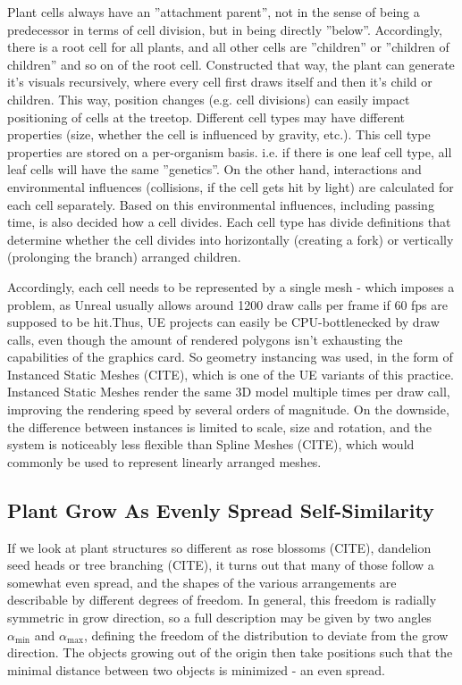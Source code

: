 \documentclass[11pt]{scrartcl}
\begin{document}
Plant cells always have an ''attachment parent'', not in the sense of being a predecessor in terms of cell division, but in being directly ''below''. Accordingly, there is a root cell for all plants, and all other cells are ''children'' or ''children of children'' and so on of the root cell. Constructed that way, the plant can generate it's visuals recursively, where every cell first draws itself and then it's child or children. This way, position changes (e.g. cell divisions) can easily impact positioning of cells at the treetop.
Different cell types may have different properties (size, whether the cell is influenced by gravity, etc.). This cell type properties are stored on a per-organism basis. i.e. if there is one leaf cell type, all leaf cells will have the same ''genetics''. On the other hand, interactions and environmental influences (collisions, if the cell gets hit by light) are calculated for each cell separately. Based on this environmental influences, including passing time, is also decided how a cell divides. Each cell type has divide definitions that determine whether the cell divides into horizontally (creating a fork) or vertically (prolonging the branch) arranged children.

Accordingly, each cell needs to be represented by a single mesh - which imposes a problem, as Unreal usually allows around 1200 draw calls per frame if 60 fps are supposed to be hit.Thus, UE projects can easily be CPU-bottlenecked by draw calls, even though the amount of rendered polygons isn’t exhausting the capabilities of the graphics card. So geometry instancing was used, in the form of Instanced Static Meshes (CITE), which is one of the UE variants of this practice. Instanced Static Meshes render the same 3D model multiple times per draw call, improving the rendering speed by several orders of magnitude. On the downside, the difference between instances is limited to scale, size and rotation, and the system is noticeably less flexible than Spline Meshes (CITE), which would commonly be used to represent linearly arranged meshes.

\subsection{Plant Grow As Evenly Spread Self-Similarity} \label{cpt:EvenSelfSim}
If we look at plant structures so different as rose blossoms (CITE), dandelion seed heads or tree branching (CITE), it turns out that many of those follow a somewhat even spread, and the shapes of the various arrangements are describable by different degrees of freedom. In general, this freedom is radially symmetric in grow direction, so a full description may be given by two angles $\alpha_\text{min}$ and $\alpha_\text{max}$, defining the freedom of the distribution to deviate from the grow direction. The objects growing out of the origin then take positions such that the minimal distance between two objects is minimized - an even spread.
\end{document}
